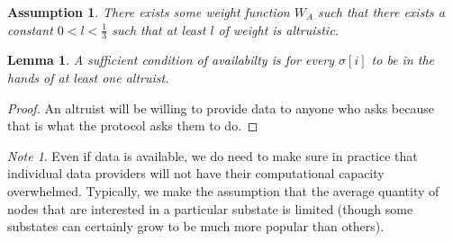 \documentclass[11pt,a4paper]{report}
\theoremstyle{plain}
\newtheorem{lem}[thm]{Lemma}
\newtheorem{assm}{Assumption}[chapter]
\theoremstyle{definition}
\theoremstyle{remark}
\newtheorem*{note}{Note}
\begin{document}
\begin{assm}
There exists some weight function $W_A$ such that there exists a constant $0 < l < \frac{1}{3}$ such that at least $l$ of weight is altruistic.
\end{assm}

\begin{lem}
A sufficient condition of availabilty is for every $\sigma[i]$ to be in the hands of at least one altruist.
\end{lem}

\begin{proof}
An altruist will be willing to provide data to anyone who asks because that is what the protocol asks them to do.
\end{proof}

\begin{note}
Even if data is available, we do need to make sure in practice that individual data providers will not have their computational capacity overwhelmed. Typically, we make the assumption that the average quantity of nodes that are interested in a particular substate is limited (though some substates can certainly grow to be much more popular than others).
\end{note}
\end{document}
